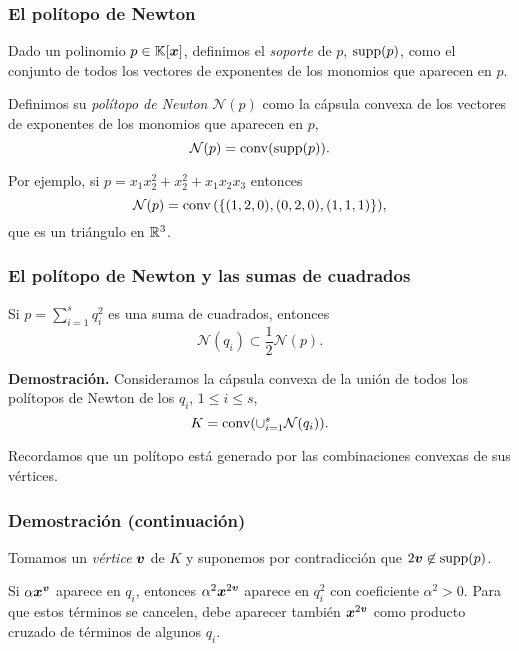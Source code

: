 \documentclass[aspectratio=169,12pt,spanish]{beamer}
\begin{document}

\begin{frame}
\frametitle{El polítopo de Newton}

Dado un polinomio $p \in \mathbb{K}[\bm{x}]$, definimos el \emph{soporte} de $p$, $\operatorname{supp}(p)$, como el conjunto de todos los vectores de exponentes de los monomios que aparecen en $p$.

Definimos  su \emph{polítopo de Newton} $\mathcal{N}(p)$ como la cápsula convexa de los vectores de exponentes de los monomios que aparecen en $p$,
$$
\mathcal{N}(p) = \operatorname{conv}(\operatorname{supp}(p)).
$$

Por ejemplo, si $p = x_1 x_2^2 + x_2^2 + x_1 x_2 x_3$ entonces 
$$
\mathcal{N}(p) = \operatorname{conv}{(\{(1,2,0), (0,2,0), (1,1,1)\})},
$$
que es un triángulo en $\mathbb{R}^3$.
\end{frame}


\begin{frame}
\frametitle{El polítopo de Newton y las sumas de cuadrados}


\begin{theorem}
Si $p = \sum_{i = 1}^s q_i^2$ es una suma de cuadrados, entonces
$$
\mathcal{N}(q_i) \subset \frac{1}{2}\mathcal{N}(p).
$$
\end{theorem}

\textbf{Demostración.}
Consideramos la cápsula convexa de la unión de todos los polítopos de Newton de los $q_i$, $1 \le i \le s$,
$$
K = \operatorname{conv}(\cup_{i=1}^s\mathcal{N}(q_i)).
$$

Recordamos que un polítopo está generado por las combinaciones convexas de sus vértices.

\end{frame}


\begin{frame}
\frametitle{Demostración (continuación)}



Tomamos un \emph{vértice} $\bm{v}$ de $K$ y suponemos por contradicción que $2\bm{v} \not\in \operatorname{supp}(p)$.

Si $\alpha \bm{x}^{\bm{v}}$ aparece en $q_i$, entonces $\alpha^2 \bm{x}^{2\bm{v}}$ aparece en $q_i^2$ con coeficiente $\alpha^2 > 0$. Para que estos términos se cancelen, debe aparecer también $\bm{x}^{2\bm{v}}$ como producto cruzado de términos de algunos $q_i$.
\end{frame}
\end{document}
